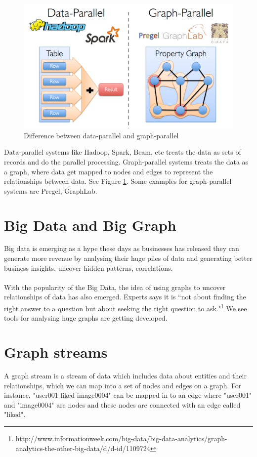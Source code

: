 \documentclass[12pt]{report}
\numberwithin{figure}{section}
\numberwithin{table}{section}
\begin{document}
\begin{figure}[H]
\centering
\includegraphics[scale=0.3]{images/image00}
\caption{Difference between data-parallel and graph-parallel}
\label{fig:parallel}
\end{figure}

Data-parallel systems like Hadoop, Spark, Beam, etc treats the data as sets of records and do the parallel processing. Graph-parallel systems treats the data as a graph, where data get mapped to nodes and edges to represent the relationships between data. See Figure \ref{fig:parallel}. Some examples for graph-parallel systems are Pregel, GraphLab.

\section{Big Data and Big Graph}
Big data is emerging as a hype these days as businesses has released they can generate more revenue by analysing their huge piles of data and generating better business insights,  uncover hidden patterns, correlations. 

\paragraph{}

With the popularity of the Big Data, the idea of using graphs to uncover relationships of data has also emerged. Experts says it is “not about finding the right answer to a question but about seeking the right question to ask."\footnote{http://www.informationweek.com/big-data/big-data-analytics/graph-analytics-the-other-big-data/d/d-id/1109724} We see tools for analysing huge graphs are getting developed.

\section{Graph streams}
A graph stream is a stream of data which includes data about entities and their relationships, which we can map into a set of nodes and edges on a graph. For instance, "user001 liked image0004" can be mapped in to an edge where "user001" and "image0004" are nodes and these nodes are connected with an edge called "liked".
\end{document}
